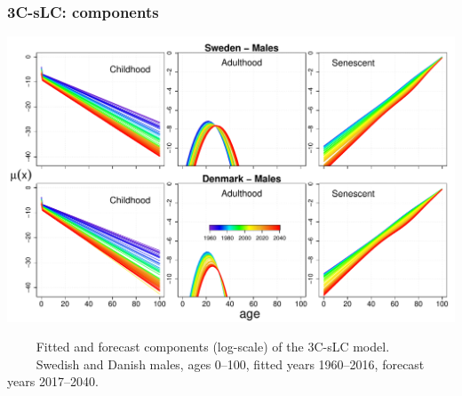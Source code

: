\documentclass[12pt, xcolor=table]{beamer}  %
\begin{document}
\begin{frame}           
	\frametitle{3C-sLC: components}
	
	\vspace{-0.35cm}
	
	\begin{center}
	\includegraphics[scale=.42]{Figures/Ch5/RATES_FORE_M}
	
	\end{center}
	
\vspace{-0.2cm}	
\tiny{$\quad\quad$ Fitted and forecast components (log-scale) of the 3C-sLC model. \\ $\quad\quad$ Swedish and Danish males, ages 0--100, fitted years 1960--2016, forecast years 2017--2040.}	
\end{frame}
\end{document}

